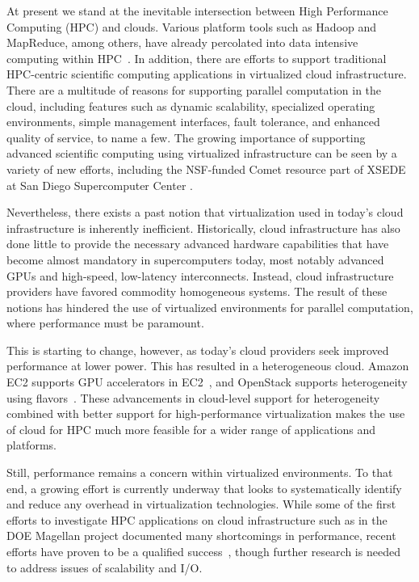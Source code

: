 \documentclass[10pt]{sigplanconf}
\begin{document}
At present we stand at the inevitable intersection between High Performance Computing (HPC) and clouds. Various platform tools such as Hadoop and MapReduce, among others, have already percolated into data intensive computing within HPC~\cite{jha2014apache}.  In addition, there are efforts to support traditional HPC-centric scientific computing applications in virtualized cloud infrastructure.  There are a multitude of reasons for supporting parallel computation in the cloud\cite{Armbrust2010}, including features such as dynamic scalability, specialized operating environments, simple management interfaces, fault tolerance, and enhanced quality of service, to name a few. The growing importance of supporting advanced scientific computing using virtualized infrastructure can be seen by a variety of new efforts, including the NSF-funded Comet resource part of XSEDE at San Diego Supercomputer Center \cite{moore2014gateways}.  

Nevertheless, there exists a past notion that virtualization used in today's
cloud infrastructure is inherently inefficient.  Historically, cloud
infrastructure has also done little to provide the necessary advanced hardware
capabilities that have become almost mandatory in supercomputers today, most
notably advanced GPUs and high-speed, low-latency interconnects.  Instead, cloud
infrastructure providers have favored commodity homogeneous systems.  The result
of these notions has hindered the use of virtualized environments for parallel
computation, where performance must be paramount.

This is starting to change, however, as today's cloud providers seek improved
performance at lower power.  This has resulted in a heterogeneous cloud.
Amazon EC2 supports GPU accelerators in EC2~\cite{www-amazon-gpu}, and
OpenStack supports heterogeneity using flavors~\cite{www-openstack-flavors}.
These advancements in cloud-level support for heterogeneity combined with better
support for high-performance virtualization makes the use of cloud for HPC much
more feasible for a wider range of applications and platforms.

Still, performance remains a concern within virtualized environments.  To that
end, a growing effort is currently underway that looks to systematically identify and
reduce any overhead in virtualization technologies.  While some of the first efforts to investigate HPC applications on cloud infrastructure such as in the DOE Magellan project \cite{yelick2011magellan} documented many shortcomings in performance, recent efforts have proven to be a qualified success~\cite{Younge2011cloud, Luszczek:2011:EHC}, though further research is needed to address
issues of scalability and I/O.  
\end{document}
